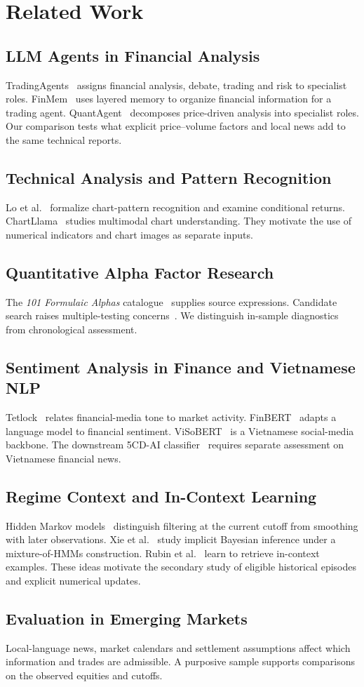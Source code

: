 \section{Related Work}
\label{sec:relatedworks}

\subsection{LLM Agents in Financial Analysis}
TradingAgents~\cite{tradingagents2024} assigns financial analysis, debate,
trading and risk to specialist roles. FinMem~\cite{yu2025finmem} uses
layered memory to organize financial information for a trading agent.
QuantAgent~\cite{xiong2025quantagent} decomposes price-driven analysis
into specialist roles. Our comparison tests what explicit price--volume
factors and local news add to the same technical reports.

\subsection{Technical Analysis and Pattern Recognition}
Lo et al.~\cite{lo2000technical} formalize chart-pattern recognition and
examine conditional returns. ChartLlama~\cite{han2023chartllama} studies
multimodal chart understanding. They motivate the use of numerical indicators and chart images as
separate inputs.

\subsection{Quantitative Alpha Factor Research}
The \emph{101 Formulaic Alphas} catalogue~\cite{kakushadze2016formulaic}
supplies source expressions. Candidate search raises multiple-testing
concerns~\cite{harvey2016}. We distinguish in-sample diagnostics from
chronological assessment.

\subsection{Sentiment Analysis in Finance and Vietnamese NLP}
Tetlock~\cite{tetlock2007news} relates financial-media tone to market
activity. FinBERT~\cite{araci2019finbert} adapts a language model to
financial sentiment. ViSoBERT~\cite{nguyen2023visobert} is a Vietnamese
social-media backbone. The downstream 5CD-AI classifier~\cite{hf5cdsentiment}
requires separate assessment on Vietnamese financial news.

\subsection{Regime Context and In-Context Learning}
Hidden Markov models~\cite{rabiner1989hmm} distinguish filtering at the
current cutoff from smoothing with later observations. Xie et
al.~\cite{xie2022implicitbayes} study implicit Bayesian inference under a
mixture-of-HMMs construction. Rubin et al.~\cite{rubin2022retrieve} learn
to retrieve in-context examples. These ideas motivate the secondary study of eligible historical episodes and
explicit numerical updates.

\subsection{Evaluation in Emerging Markets}
Local-language news, market calendars and settlement assumptions affect
which information and trades are admissible. A purposive sample supports
comparisons on the observed equities and cutoffs.
